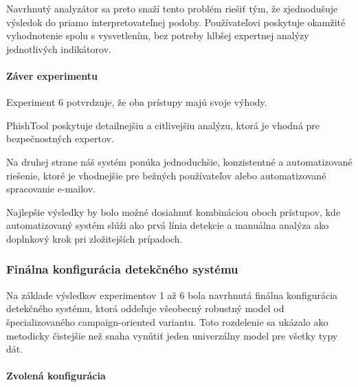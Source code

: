\documentclass[conference]{IEEEtran}
\begin{document}
Navrhnutý analyzátor sa preto snaží tento problém riešiť tým, že
zjednodušuje výsledok do priamo interpretovateľnej podoby.
Používateľovi poskytuje okamžité vyhodnotenie spolu s vysvetlením,
bez potreby hlbšej expertnej analýzy jednotlivých indikátorov.

\paragraph{Záver experimentu}

Experiment 6 potvrdzuje, že oba prístupy majú svoje výhody.

PhishTool poskytuje detailnejšiu a citlivejšiu analýzu,
ktorá je vhodná pre bezpečnostných expertov.

Na druhej strane náš systém ponúka jednoduchšie,
konzistentné a automatizované riešenie,
ktoré je vhodnejšie pre bežných používateľov alebo
automatizované spracovanie e-mailov.

Najlepšie výsledky by bolo možné dosiahnuť kombináciou oboch prístupov,
kde automatizovaný systém slúži ako prvá línia detekcie
a manuálna analýza ako doplnkový krok pri zložitejších prípadoch.


\subsubsection{Finálna konfigurácia detekčného systému}

Na základe výsledkov experimentov 1 až 6 bola navrhnutá finálna konfigurácia
detekčného systému, ktorá oddeľuje všeobecný robustný model od
špecializovaného campaign-oriented variantu. Toto rozdelenie sa ukázalo
ako metodicky čistejšie než snaha vynútiť jeden univerzálny model pre
všetky typy dát.

\paragraph{Zvolená konfigurácia}
\end{document}
